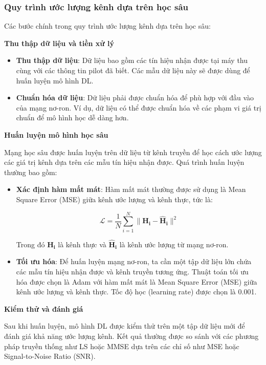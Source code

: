 \subsubsection{Quy trình ước lượng kênh dựa trên học sâu}

Các bước chính trong quy trình ước lượng kênh dựa trên học sâu:

\textbf{Thu thập dữ liệu và tiền xử lý}

\begin{itemize}
    \item \textbf{Thu thập dữ liệu}: 
    Dữ liệu bao gồm các tín hiệu nhận được tại máy thu cùng với các thông tin pilot đã biết. 
    Các mẫu dữ liệu này sẽ được dùng để huấn luyện mô hình DL.
    \item \textbf{Chuẩn hóa dữ liệu}: 
    Dữ liệu phải được chuẩn hóa để phù hợp với đầu vào của mạng nơ-ron. 
    Ví dụ, dữ liệu có thể được chuẩn hóa về các phạm vi giá trị chuẩn để mô hình học dễ dàng hơn.
\end{itemize}

\textbf{Huấn luyện mô hình học sâu}

Mạng học sâu được huấn luyện trên dữ liệu từ kênh truyền để học cách ước lượng các giá trị kênh dựa trên các mẫu tín hiệu nhận được. 
Quá trình huấn luyện thường bao gồm:

\begin{itemize}
    \item \textbf{Xác định hàm mất mát}: Hàm mất mát thường được sử dụng là Mean Square Error (MSE) giữa kênh ước lượng và kênh thực, tức là:

    \begin{equation}
        \mathcal{L} = \frac{1}{N} \sum_{i=1}^{N} \| \bm{H_i} - \bm{\hat{H}_i} \|^2
    \end{equation}
    
    Trong đó \( \bm{H_i} \) là kênh thực và \( \bm{\hat{H}_i} \) là kênh ước lượng từ mạng nơ-ron.

    \item \textbf{Tối ưu hóa}: Để huấn luyện mạng nơ-ron, ta cần một tập dữ liệu lớn chứa các mẫu tín hiệu nhận được và kênh truyền tương ứng. Thuật toán tối ưu hóa được chọn là Adam với hàm mất mát là Mean Square Error (MSE) giữa kênh ước lượng và kênh thực. Tốc độ học (learning rate) được chọn là 0.001.
\end{itemize}

\textbf{Kiểm thử và đánh giá}

Sau khi huấn luyện, mô hình DL được kiểm thử trên một tập dữ liệu mới để đánh giá khả năng ước lượng kênh. 
Kết quả thường được so sánh với các phương pháp truyền thống như LS hoặc MMSE dựa trên các chỉ số như MSE hoặc Signal-to-Noise Ratio (SNR).